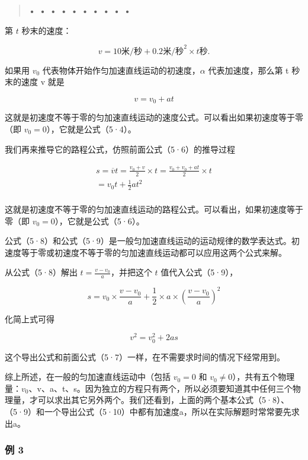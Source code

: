 \begin{quote}
\textbf{• • • • • • • • • •}
\end{quote}

第 \(t\) 秒末的速度：

\[
v = 10 \text{米/秒} + 0.2 \text{米/秒} ^ {2} \times t \text{秒}.
\]

如果用 \(v_{0}\) 代表物体开始作匀加速直线运动的初速度，\(\alpha\)
代表加速度，那么第 t 秒末的速度 v 就是

\[
v = v _ {0} + a t \tag {5.8}
\]

这就是初速度不等于零的匀加速直线运动的速度公式。可以看出如果初速度等于零（即
\(v_{0}=0\)），它就是公式（5·4）。

我们再来推导它的路程公式，仿照前面公式（5·6）的推导过程

\[
\begin{array}{l} s = \overline {{v}} t = \frac {v _ {0} + v}{2} \times t = \frac {v _ {0} + v _ {0} + a t}{2} \times t \\ = v _ {0} t + \frac {1}{2} a t ^ {2} \tag{5.9} \\ \end{array}
\]

这就是初速度不等于零的匀加速直线运动的路程公式。可以看出，如果初速度等于零（即
\(v_{0}=0\)），它就是公式（5·6）。

公式（5·8）和公式（5·9）是一般匀加速直线运动的运动规律的数学表达式。初速度等于零或初速度不等于零的匀加速直线运动都可以应用这两个公式来解。

从公式（5·8）解出 \(t = \frac{v - v_0}{a}\)，并把这个 \(t\)
值代入公式（5·9），

\[
s = v _ {0} \times \frac {v - v _ {0}}{a} + \frac {1}{2} \times a \times \left(\frac {v - v _ {0}}{a}\right) ^ {2}
\]

化简上式可得

\[
v ^ {2} = v _ {0} ^ {2} + 2 a s \tag {5.10}
\]

这个导出公式和前面公式（5·7）一样，在不需要求时间的情况下经常用到。

综上所述，在一般的匀加速直线运动中（包括 \(v_{0}=0\) 和
\(v_{0}\neq0\)），共有五个物理量：\(v_{0}\)、v、a、t、s。因为独立的方程只有两个，所以必须要知道其中任何三个物理量，才可以求出其它另外两个。我们还看到，上面的两个基本公式（5·8）、（5·9）和一个导出公式（5·10）中都有加速度a，所以在实际解题时常常要先求出a。

\subsubsection{例 3}\label{ux4f8b-3-3}

